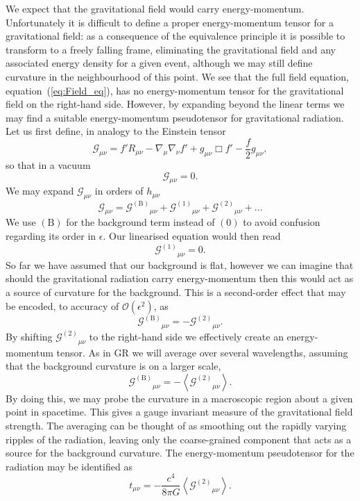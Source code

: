 \documentclass[a4paper, 11pt, titlepage, twoside]{report}
\newcommand{\eqnref}[1]{equation~(\ref{eq:#1})}
\newcommand{\order}[1]{\ensuremath{\mathcal{O}({#1})}}
\begin{document}
We expect that the gravitational field would carry energy-momentum. Unfortunately it is difficult to define a proper energy-momentum tensor for a gravitational field: as a consequence of the equivalence principle it is possible to transform to a freely falling frame, eliminating the gravitational field and any associated energy density for a given event, although we may still define curvature in the neighbourhood of this point. We see that the full field equation, \eqnref{Field_eq}, has no energy-momentum tensor for the gravitational field on the right-hand side. However, by expanding beyond the linear terms we may find a suitable energy-momentum pseudotensor for gravitational radiation. Let us first define, in analogy to the Einstein tensor
\begin{equation}
\mathcal{G}_{\mu\nu} = f'R_{\mu\nu} - \nabla_\mu\nabla_\nu f' + g_{\mu\nu}\Box f' - \frac{f}{2}g_{\mu\nu},
\end{equation}
so that in a vacuum
\begin{equation}
\mathcal{G}_{\mu\nu} = 0.
\end{equation}
We may expand $\mathcal{G}_{\mu\nu}$ in orders of $h_{\mu\nu}$
\begin{equation}
\mathcal{G}_{\mu\nu} = {\mathcal{G}^{(\mathrm{B})}}_{\mu\nu} + {\mathcal{G}^{(1)}}_{\mu\nu} + {\mathcal{G}^{(2)}}_{\mu\nu} + \ldots
\label{eq:G_exp}
\end{equation}
We use $(\mathrm{B})$ for the background term instead of $(0)$ to avoid confusion regarding its order in $\epsilon$. Our linearised equation would then read
\begin{equation}
{\mathcal{G}^{(1)}}_{\mu\nu} = 0.
\end{equation}
So far we have assumed that our background is flat, however we can imagine that should the gravitational radiation carry energy-momentum then this would act as a source of curvature for the background. This is a second-order effect that may be encoded, to accuracy of $\order{\epsilon^2}$, as
\begin{equation}
{\mathcal{G}^{(\mathrm{B})}}_{\mu\nu} = -{\mathcal{G}^{(2)}}_{\mu\nu}.
\end{equation}
By shifting ${\mathcal{G}^{(2)}}_{\mu\nu}$ to the right-hand side we effectively create an energy-momentum tensor. As in GR we will average over several wavelengths, assuming that the background curvature is on a larger scale,
\begin{equation}
{\mathcal{G}^{(\mathrm{B})}}_{\mu\nu} = -\left\langle{\mathcal{G}^{(2)}}_{\mu\nu}\right\rangle.
\end{equation}
By doing this, we may probe the curvature in a macroscopic region about a given point in spacetime. This gives a gauge invariant measure of the gravitational field strength. The averaging can be thought of as smoothing out the rapidly varying ripples of the radiation, leaving only the coarse-grained component that acts as a source for the background curvature. The energy-momentum pseudotensor for the radiation may be identified as
\begin{equation}
t_{\mu\nu} = -\frac{c^4}{8\pi G}\left\langle{\mathcal{G}^{(\mathrm{2})}}_{\mu\nu}\right\rangle.
\end{equation}
\end{document}

